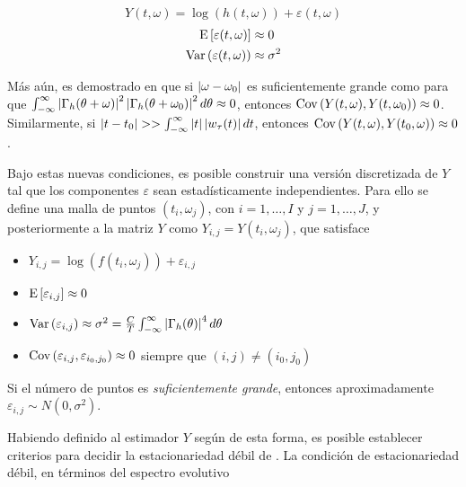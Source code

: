 \begin{equation}
Y(t,\omega) = \log\left(h(t,\omega) \right) + \varepsilon(t,\omega)
\end{equation}
\begin{align*}
\mathrm{E}\left[ \varepsilon(t,\omega) \right] &\approx 0 \\
\mathrm{Var}\left( \varepsilon(t,\omega) \right) &\approx \sigma^{2}
\end{align*}

Más aún, es demostrado en \cite{Priestley66} que si $\left| \omega-\omega_0 \right|$ es suficientemente 
grande como para que 
$\int_{-\infty}^{\infty} \left| \Gamma_h(\theta+\omega) \right|^{2}\left| \Gamma_h(\theta+\omega_0) \right|^{2} d\theta \approx 0$,
entonces 
%
$\mathrm{Cov}\left( Y(t,\omega),Y(t,\omega_0) \right) \approx 0$.
%
Similarmente, si $\left| t-t_0 \right| >> \int_{-\infty}^{\infty} \left| t \right| \left| w_\tau (t) \right| dt $, entonces
%
$\mathrm{Cov}\left( Y(t,\omega),Y(t_0,\omega) \right) \approx 0$.

Bajo estas nuevas condiciones, es posible construir una versión discretizada de $Y$ tal que los 
componentes $\varepsilon$ sean estadísticamente independientes. Para ello se define una malla de 
puntos $(t_i,\omega_j)$, con $i = 1,\dots,I$ y  $j=1,\dots,J$, y posteriormente a la matriz $Y$ 
como $Y_{i,j} = Y(t_i,\omega_j)$, que satisface
%
\begin{itemize}
\item $Y_{i,j} = \log\left(f(t_i,\omega_j)\right) + \varepsilon_{i,j}$
\item $\mathrm{E}\left[ \varepsilon_{i,j} \right] \approx 0$
\item $\mathrm{Var}\left( \varepsilon_{i,j} \right) \approx \sigma^{2} = 
\frac{C}{T} \int_{-\infty}^{\infty} \left| \Gamma_h(\theta) \right|^{4} d\theta$
\item $\mathrm{Cov}\left( \varepsilon_{i,j},\varepsilon_{i_0,j_0} \right) \approx 0$ siempre que $(i,j)\neq (i_0,j_0)$
\end{itemize}

Si el número de puntos es \textit{suficientemente grande}, entonces aproximadamente
$\varepsilon_{i,j} \sim N(0,\sigma^{2})$.

Habiendo definido al estimador $Y$ según de esta forma, es posible establecer criterios para
decidir la estacionariedad débil de \xt.
%
La condición de estacionariedad débil, en términos del espectro evolutivo 



